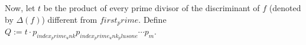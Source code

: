Now, let $t$ be the product of every prime divisor of the discriminant of $f$ (denoted by $\Delta(f)$) different from ${first_prime}$. Define $Q:=t\cdot p_{{index_prime_unk}}p_{{index_prime_unk_plusone}}\cdots p_m$.